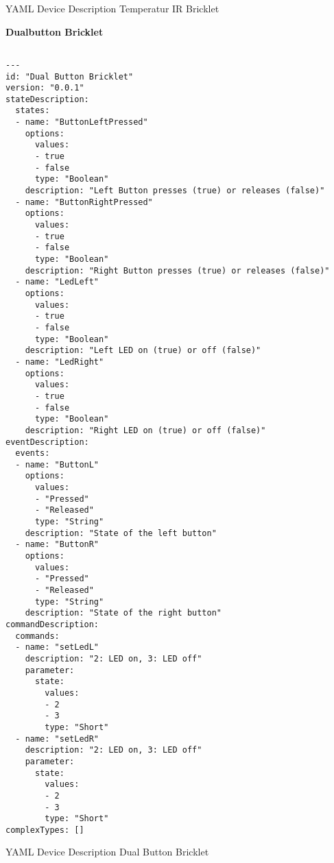 \begin{listing}[H]
\caption{YAML Device Description Temperatur IR Bricklet}
\end{listing}


\textbf{Dualbutton Bricklet}

\begin{verbatim}

---
id: "Dual Button Bricklet"
version: "0.0.1"
stateDescription:
  states:
  - name: "ButtonLeftPressed"
    options:
      values:
      - true
      - false
      type: "Boolean"
    description: "Left Button presses (true) or releases (false)"
  - name: "ButtonRightPressed"
    options:
      values:
      - true
      - false
      type: "Boolean"
    description: "Right Button presses (true) or releases (false)"
  - name: "LedLeft"
    options:
      values:
      - true
      - false
      type: "Boolean"
    description: "Left LED on (true) or off (false)"
  - name: "LedRight"
    options:
      values:
      - true
      - false
      type: "Boolean"
    description: "Right LED on (true) or off (false)"
eventDescription:
  events:
  - name: "ButtonL"
    options:
      values:
      - "Pressed"
      - "Released"
      type: "String"
    description: "State of the left button"
  - name: "ButtonR"
    options:
      values:
      - "Pressed"
      - "Released"
      type: "String"
    description: "State of the right button"
commandDescription:
  commands:
  - name: "setLedL"
    description: "2: LED on, 3: LED off"
    parameter:
      state:
        values:
        - 2
        - 3
        type: "Short"
  - name: "setLedR"
    description: "2: LED on, 3: LED off"
    parameter:
      state:
        values:
        - 2
        - 3
        type: "Short"
complexTypes: []

\end{verbatim}
\begin{listing}[H]
\caption{YAML Device Description Dual Button Bricklet}
\end{listing}